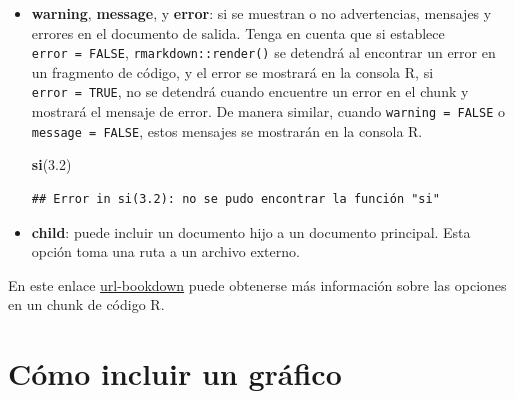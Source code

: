 \documentclass[12pt,a4paper,]{book}
\newenvironment{Shaded}{\begin{snugshade}}{\end{snugshade}}
\newcommand{\FloatTok}[1]{\textcolor[rgb]{0.00,0.00,0.81}{#1}}
\newcommand{\FunctionTok}[1]{\textcolor[rgb]{0.13,0.29,0.53}{\textbf{#1}}}
\newcommand{\NormalTok}[1]{#1}
\newcommand{\SpecialCharTok}[1]{\textcolor[rgb]{0.81,0.36,0.00}{\textbf{#1}}}
\newcommand{\StringTok}[1]{\textcolor[rgb]{0.31,0.60,0.02}{#1}}
\numberwithin{dummy}{section}
\theoremstyle{ocrenumbox}
\theoremstyle{blacknumex}
\theoremstyle{blacknumbox}
\theoremstyle{ocrenum}
\theoremstyle{ocrenum}
\newenvironment{markdownsal}{\begin{mBox}}{\end{mBox}}
\newcommand{\bmarkdownsal}{\begin{markdownsal}}
\newcommand{\emarkdownsal}{\end{markdownsal}}
\begin{document}
\begin{itemize}
\begin{itemize}
    \bmarkdownsal

\begin{Shaded}
\begin{Highlighting}[]
\FunctionTok{cat}\NormalTok{(}\StringTok{\textquotesingle{}**Markdown** es genial. }\SpecialCharTok{\textbackslash{}n}\StringTok{\textquotesingle{}}\NormalTok{)}
\end{Highlighting}
\end{Shaded}

\begin{verbatim}
## **Markdown** es genial.
\end{verbatim}

    \emarkdownsal
  \end{itemize}
\item
  \textbf{warning}, \textbf{message}, y \textbf{error}: si se muestran o
  no advertencias, mensajes y errores en el documento de salida. Tenga
  en cuenta que si establece \texttt{error\ =\ FALSE},
  \texttt{rmarkdown::render()} se detendrá al encontrar un error en un
  fragmento de código, y el error se mostrará en la consola R, si
  \texttt{error\ =\ TRUE}, no se detendrá cuando encuentre un error en
  el chunk y mostrará el mensaje de error. De manera similar, cuando
  \texttt{warning\ =\ FALSE} o \texttt{message\ =\ FALSE}, estos
  mensajes se mostrarán en la consola R.

  \bmarkdownsal

\begin{Shaded}
\begin{Highlighting}[]
\FunctionTok{si}\NormalTok{(}\FloatTok{3.2}\NormalTok{)}
\end{Highlighting}
\end{Shaded}

\begin{verbatim}
## Error in si(3.2): no se pudo encontrar la función "si"
\end{verbatim}

  \emarkdownsal
\item
  \textbf{child}: puede incluir un documento hijo a un documento
  principal. Esta opción toma una ruta a un archivo externo.
\end{itemize}

En este enlace
\href{https://bookdown.org/yihui/rmarkdown/r-code.html}{url-bookdown}
puede obtenerse más información sobre las opciones en un chunk de código
R.

\hypertarget{sec:incluirgrafico}{%
\section{Cómo incluir un gráfico}\label{sec:incluirgrafico}}
\end{document}
